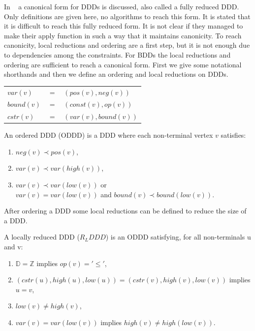 In ~\cite{ddds} a canonical form for DDDs is discussed, also called a fully reduced DDD. Only definitions are given here, no algorithms to reach this form. It is stated that it is difficult to reach this fully reduced form. It is not clear if they managed to make their apply function in such a way that it maintains canonicity. To reach canonicity, local reductions and ordering are a first step, but it is not enough due to dependencies among the constraints. For BDDs the local reductions and ordering are sufficient to reach a canonical form. First we give some notational shorthands and then we define an ordering and local reductions on DDDs.
%
\begin{center}
\begin{tabular}{lll}
$var(v)$   & $=$ & $(pos(v),neg(v))$   \\
$bound(v)$ & $=$ & $(const(v),op(v))$  \\
$cstr(v)$  & $=$ & $(var(v),bound(v))$
\end{tabular}
\end{center}

\begin{mydef}
\label{def:ODDD}
An ordered DDD (ODDD) is a DDD where each non-terminal vertex $v$ satisfies:
\begin{enumerate}
  \item $neg(v) \prec pos(v)$,
  \item $var(v) \prec var(high(v))$,
  \item $var(v) \prec var(low(v))$ or \\ $var(v) = var(low(v))$ and $bound(v) \prec bound(low(v))$.
\end{enumerate}
\end{mydef}

After ordering a DDD some local reductions can be defined to reduce the size of a DDD.

\begin{mydef}
A locally reduced DDD ($R_LDDD$) is an ODDD satisfying, for all non-terminals u and v:
\begin{enumerate}
  \item $\mathbb{D} = \mathbb{Z}$ implies $op(v) = '\leq'$,
  \item $(cstr(u),high(u),low(u)) = (cstr(v),high(v),low(v))$ implies $u = v$,
  \item $low(v) \neq high(v)$,
  \item $var(v) = var(low(v))$ implies $high(v) \neq high(low(v))$.
\end{enumerate}
\end{mydef}

